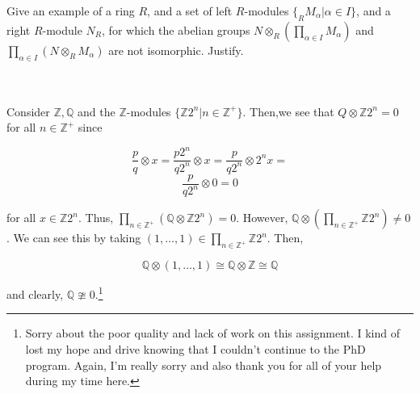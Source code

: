 Give an example of a ring $R$, and a set of left $R$-modules $\{_RM_{\alpha}|\alpha\in I\}$, and a right
$R$-module $N_R$, for which the abelian groups $N\otimes_R(\prod_{\alpha\in I}M_{\alpha})$ and
$\prod_{\alpha\in I}(N\otimes_RM_{\alpha})$ are not isomorphic. Justify.\\\\

\begin{solution}\renewcommand{\qedsymbol}{}\ \\
    
    Consider $\mathbb{Z}, \mathbb{Q}$ and the $\mathbb{Z}$-modules $\{\mathbb{Z}2^n|n\in\mathbb{Z}^+\}$.
    Then,we see that $Q\otimes\mathbb{Z}2^n=0$ for all $n\in\mathbb{Z}^+$ since
    
    $$\frac{p}{q}\otimes x=\frac{p2^n}{q2^n}\otimes x=\frac{p}{q2^n}\otimes2^nx=$$
    $$\frac{p}{q2^n}\otimes0=0$$

    for all $x\in\mathbb{Z}2^n$. Thus, $\prod_{n\in\mathbb{Z}^+}(\mathbb{Q}\otimes\mathbb{Z}2^n)=0$.
    However, $\mathbb{Q}\otimes(\prod_{n\in\mathbb{Z}^+}\mathbb{Z}2^n)\neq0$. We can see this by taking
    $(1,\ldots,1)\in\prod_{n\in\mathbb{Z}^+}\mathbb{Z}2^n$. Then,
    
    $$\mathbb{Q}\otimes(1,\ldots,1)\cong\mathbb{Q}\otimes\mathbb{Z}\cong\mathbb{Q}$$

    and clearly, $\mathbb{Q}\ncong0$.\footnote{Sorry about the poor quality and lack of work on this
    assignment. I kind of lost my hope and drive knowing that I couldn't continue to the PhD program.
    Again, I'm really sorry and also thank you for all of your help during my time here.}

\end{solution}